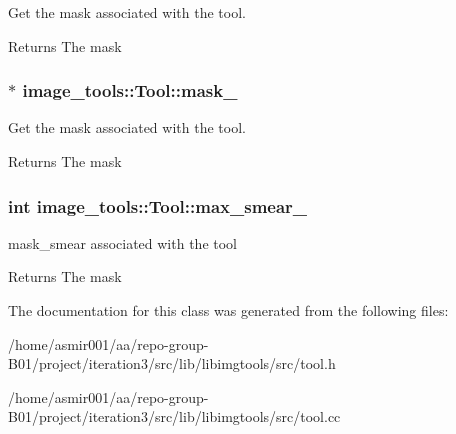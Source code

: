 Get the mask associated with the tool. 

\begin{DoxyReturn}{Returns}
The mask 
\end{DoxyReturn}
\subsubsection[{\texorpdfstring{mask\+\_\+}{mask_}}]{$\ast$ image\+\_\+tools\+::\+Tool\+::mask\+\_\+\hspace{0.3cm}{\ttfamily [private]}}\hypertarget{classimage__tools_1_1Tool_a318a254280db4cc65ab7e185b1c41db4}{}\label{classimage__tools_1_1Tool_a318a254280db4cc65ab7e185b1c41db4}


Get the mask associated with the tool. 

\begin{DoxyReturn}{Returns}
The mask 
\end{DoxyReturn}
\subsubsection[{\texorpdfstring{max\+\_\+smear\+\_\+}{max_smear_}}]{\setlength{\rightskip}{0pt plus 5cm}int image\+\_\+tools\+::\+Tool\+::max\+\_\+smear\+\_\+\hspace{0.3cm}{\ttfamily [private]}}\hypertarget{classimage__tools_1_1Tool_a302c8f65693346d76d026d4306ce293e}{}\label{classimage__tools_1_1Tool_a302c8f65693346d76d026d4306ce293e}


mask\+\_\+smear associated with the tool 

\begin{DoxyReturn}{Returns}
The mask 
\end{DoxyReturn}


The documentation for this class was generated from the following files\+:\begin{DoxyCompactItemize}
\item 
/home/asmir001/aa/repo-\/group-\/\+B01/project/iteration3/src/lib/libimgtools/src/tool.\+h\item 
/home/asmir001/aa/repo-\/group-\/\+B01/project/iteration3/src/lib/libimgtools/src/tool.\+cc\end{DoxyCompactItemize}
